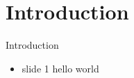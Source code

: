 

\section{Introduction}



\begin{frame}{Introduction}{}

\begin{itemize}
	\item slide 1 hello world
\end{itemize}

\end{frame}


